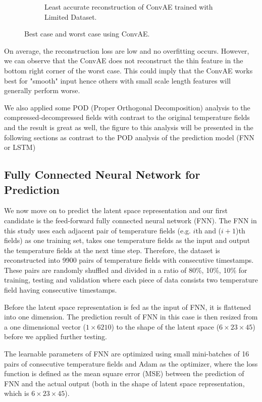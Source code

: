 \begin{figure}[H]
\begin{subfigure}{0.45\textwidth}
    \caption{Least accurate reconstruction of ConvAE trained with Limited Dataset.}
\end{subfigure}     
\caption{Best case and worst case using ConvAE.}
\label{figure:ConvAE_limited_best_worst}
\end{figure}


On average, the reconstruction loss are low and no overfitting occurs. However, we can observe that the ConvAE does not reconstruct the thin feature in the bottom right corner of the worst case. This could imply that the ConvAE works best for "smooth" input hence others with small scale length features will generally perform worse.

We also applied some POD (Proper Orthogonal Decomposition) analysis to the compressed-decompressed fields with contrast to the original temperature fields and the result is great as well, the figure to this analysis will be presented in the following sections as contrast to the POD analysis of the prediction model (FNN or LSTM) 


\subsection{Fully Connected Neural Network for Prediction}

We now move on to predict the latent space representation and our first candidate is the feed-forward fully connected neural network (FNN). The FNN in this study uses each adjacent pair of temperature fields (e.g. $i$th and ($i+1$)th fields) as one training set, takes one temperature fields as the input and output the temperature fields at the next time step. Therefore, the dataset is reconstructed into 9900 pairs of temperature fields with consecutive timestamps. These pairs are randomly shuffled and divided in a ratio of 80\%, 10\%, 10\% for training, testing and validation where each piece of data consists two temperature field having consecutive timestamps.

Before the latent space representation is fed as the input of FNN, it is flattened into one dimension. The prediction result of FNN in this case is then resized from a one dimensional vector ($1 \times 6210$) to the shape of the latent space ($6 \times 23 \times 45$) before we applied further testing.

The learnable parameters of FNN are optimized using small mini-batches of 16 pairs of consecutive temperature fields and Adam as the optimizer, where the loss function is defined as the mean square error (MSE) between the prediction of FNN and the actual output (both in the shape of latent space representation, which is $6 \times 23 \times 45$).

